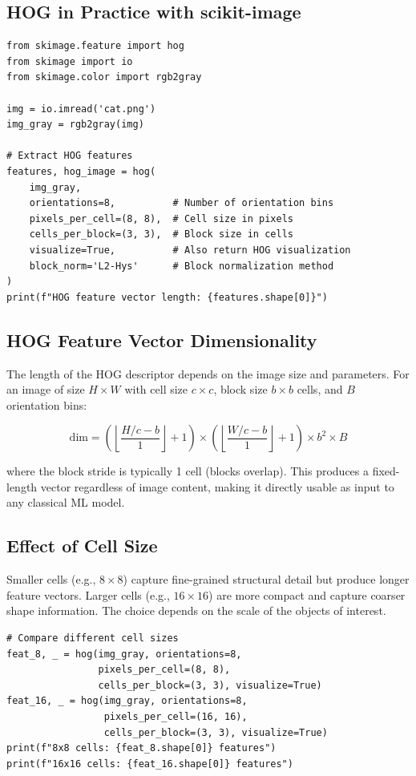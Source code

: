 \subsection*{HOG in Practice with scikit-image}

\begin{lstlisting}[style=pythonstyle]
from skimage.feature import hog
from skimage import io
from skimage.color import rgb2gray

img = io.imread('cat.png')
img_gray = rgb2gray(img)

# Extract HOG features
features, hog_image = hog(
    img_gray,
    orientations=8,          # Number of orientation bins
    pixels_per_cell=(8, 8),  # Cell size in pixels
    cells_per_block=(3, 3),  # Block size in cells
    visualize=True,          # Also return HOG visualization
    block_norm='L2-Hys'      # Block normalization method
)
print(f"HOG feature vector length: {features.shape[0]}")
\end{lstlisting}

\subsection*{HOG Feature Vector Dimensionality}

The length of the HOG descriptor depends on the image size and parameters. For an image of size $H \times W$ with cell size $c \times c$, block size $b \times b$ cells, and $B$ orientation bins:

$$
\text{dim} = \left(\left\lfloor \frac{H/c - b}{1} \right\rfloor + 1\right) \times \left(\left\lfloor \frac{W/c - b}{1} \right\rfloor + 1\right) \times b^2 \times B
$$

where the block stride is typically 1 cell (blocks overlap). This produces a fixed-length vector regardless of image content, making it directly usable as input to any classical ML model.

\subsection*{Effect of Cell Size}

Smaller cells (e.g., $8 \times 8$) capture fine-grained structural detail but produce longer feature vectors. Larger cells (e.g., $16 \times 16$) are more compact and capture coarser shape information. The choice depends on the scale of the objects of interest.

\begin{lstlisting}[style=pythonstyle]
# Compare different cell sizes
feat_8, _ = hog(img_gray, orientations=8,
                pixels_per_cell=(8, 8),
                cells_per_block=(3, 3), visualize=True)
feat_16, _ = hog(img_gray, orientations=8,
                 pixels_per_cell=(16, 16),
                 cells_per_block=(3, 3), visualize=True)
print(f"8x8 cells: {feat_8.shape[0]} features")
print(f"16x16 cells: {feat_16.shape[0]} features")
\end{lstlisting}

